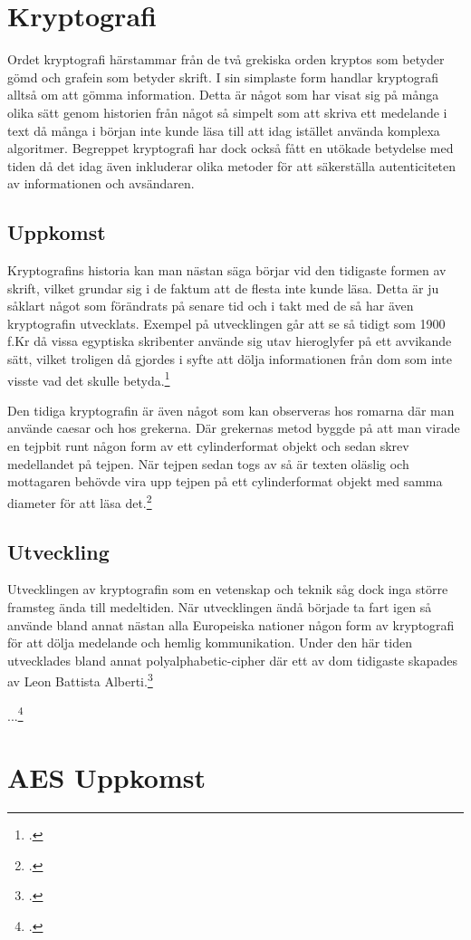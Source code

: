 
\section{Kryptografi} %
Ordet kryptografi härstammar från de två grekiska orden
kryptos som betyder gömd och grafein som betyder skrift.
I sin simplaste form handlar kryptografi alltså om att
gömma information. Detta är något som har visat sig på många
olika sätt genom historien från något så simpelt som att skriva
ett medelande i text då många i början inte kunde läsa till
att idag istället använda komplexa algoritmer.
Begreppet kryptografi har dock också fått en utökade betydelse
med tiden då det idag även inkluderar olika metoder för att
säkerställa autenticiteten av informationen och avsändaren.

\subsection{Uppkomst} %
Kryptografins historia kan man nästan säga börjar vid den
tidigaste formen av skrift, vilket grundar sig i de faktum att
de flesta inte kunde läsa. Detta är ju såklart något som förändrats
på senare tid och i takt med de så har även kryptografin utvecklats.
Exempel på utvecklingen går att se så tidigt som 1900 f.Kr då vissa egyptiska
skribenter använde sig utav hieroglyfer på ett avvikande sätt, vilket
troligen då gjordes i syfte att dölja informationen från dom som inte
visste vad det skulle betyda.\footcite{kryptografi-historia-1}

Den tidiga kryptografin är även något som kan observeras hos romarna där
man använde \gls{caesar} och hos grekerna. Där grekernas metod byggde på
att man virade en tejpbit runt någon form av ett cylinderformat objekt
och sedan skrev medellandet på tejpen. När tejpen sedan togs av så är texten %
oläslig och mottagaren behövde vira upp tejpen på ett cylinderformat objekt
med samma diameter för att läsa det.\footcite{kryptografi-historia-1}

\subsection{Utveckling} %
Utvecklingen av kryptografin som en vetenskap och teknik såg dock inga större framsteg
ända till medeltiden. När utvecklingen ändå började ta fart igen så använde bland annat
nästan alla Europeiska nationer någon form av kryptografi för att dölja medelande och hemlig kommunikation.
Under den här tiden utvecklades bland annat \gls{polyalphabetic-cipher} där ett av dom tidigaste skapades av
Leon Battista Alberti.\footcite{kryptografi-historia-1}

...\footcite{kryptografi-historia-1}

\section{AES Uppkomst} %
\label{sec:aes-uppkomst}

